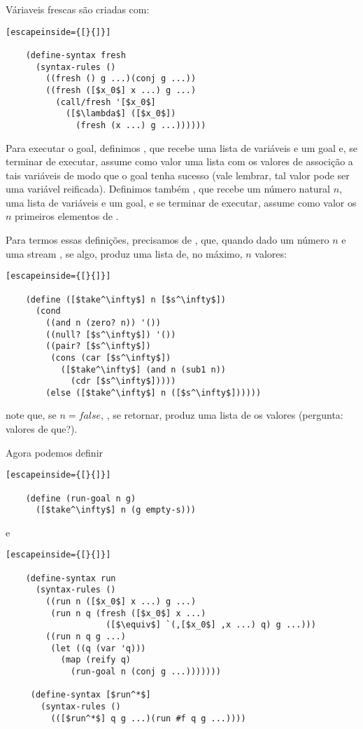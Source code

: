   Váriaveis frescas são criadas com:

  \begin{lstlisting}[escapeinside={[}{]}]

    (define-syntax fresh
      (syntax-rules ()
        ((fresh () g ...)(conj g ...))
        ((fresh ([$x_0$] x ...) g ...)
          (call/fresh '[$x_0$]
            ([$\lambda$] ([$x_0$])
              (fresh (x ...) g ...))))))

  \end{lstlisting}
  
  Para executar o goal, definimos , que recebe uma
  lista de variáveis e um goal e, se terminar de executar, assume como
  valor uma lista com os valores de associção a tais variáveis de modo
  que o goal tenha sucesso (vale lembrar, tal valor pode ser uma
  variável reificada). Definimos também , que recebe
  um número natural $n$, uma lista de variáveis e um goal, e se
  terminar de executar, assume como valor os $n$ primeiros elementos
  de .

  Para termos essas definições, precisamos de ,
  que, quando dado um número $n$ e uma stream , se
  algo, produz uma lista de, no máximo, $n$ valores:

  \begin{lstlisting}[escapeinside={[}{]}]

    (define ([$take^\infty$] n [$s^\infty$])
      (cond
        ((and n (zero? n)) '())
        ((null? [$s^\infty$]) '())
        ((pair? [$s^\infty$])
         (cons (car [$s^\infty$])
           ([$take^\infty$] (and n (sub1 n))
             (cdr [$s^\infty$]))))
        (else ([$take^\infty$] n ([$s^\infty$])))))

  \end{lstlisting}

  \noindent note que, se $n = false$, , se
  retornar, produz uma lista de  os valores (pergunta:
  valores de que?).

  Agora podemos definir

  \begin{lstlisting}[escapeinside={[}{]}]

    (define (run-goal n g)
      ([$take^\infty$] n (g empty-s)))

  \end{lstlisting}

  \noindent e

  \begin{lstlisting}[escapeinside={[}{]}]

    (define-syntax run
      (syntax-rules ()
        ((run n ([$x_0$] x ...) g ...)
         (run n q (fresh ([$x_0$] x ...)
                    ([$\equiv$] `(,[$x_0$] ,x ...) q) g ...)))
        ((run n q g ...)
         (let ((q (var 'q)))
           (map (reify q)
             (run-goal n (conj g ...)))))))

     (define-syntax [$run^*$]
       (syntax-rules ()
         (([$run^*$] q g ...)(run #f q g ...))))

  \end{lstlisting}


